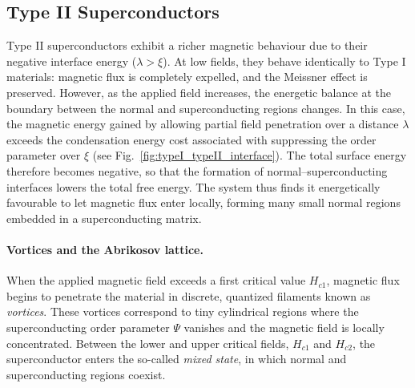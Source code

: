 \subsection*{Type II Superconductors}

Type II superconductors exhibit a richer magnetic behaviour due to their negative interface energy ($\lambda > \xi$).  
At low fields, they behave identically to Type I materials: magnetic flux is completely expelled, and the Meissner effect is preserved.  
However, as the applied field increases, the energetic balance at the boundary between the normal and superconducting regions changes.  
In this case, the magnetic energy gained by allowing partial field penetration over a distance $\lambda$ exceeds the condensation energy cost associated with suppressing the order parameter over $\xi$ (see Fig.~\ref{fig:typeI_typeII_interface}).  
The total surface energy therefore becomes negative, so that the formation of normal–superconducting interfaces lowers the total free energy.  
The system thus finds it energetically favourable to let magnetic flux enter locally, forming many small normal regions embedded in a superconducting matrix.  

\paragraph{Vortices and the Abrikosov lattice.}
When the applied magnetic field exceeds a first critical value $H_{c1}$, magnetic flux begins to penetrate the material in discrete, quantized filaments known as \textit{vortices}.  
These vortices correspond to tiny cylindrical regions where the superconducting order parameter $\Psi$ vanishes and the magnetic field is locally concentrated.  
Between the lower and upper critical fields, $H_{c1}$ and $H_{c2}$, the superconductor enters the so-called \textit{mixed state}, in which normal and superconducting regions coexist.  


